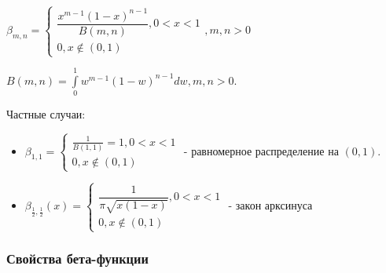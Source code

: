 \begin{definition}
  $\beta_{m, n} = \begin{cases}
    \dfrac{x^{m-1}  (1-x)^{n-1}}{B(m, n)}, 0 < x < 1 \\
    0, x \notin (0, 1)
  \end{cases}, m, n > 0$
\end{definition}

\begin{definition}
  $B(m, n) = \int\limits_0^1 w^{m-1} (1-w)^{n-1} dw, m, n>0$.
\end{definition}

\begin{remark}
  Частные случаи:
  \begin{itemize}
    \item $\beta_{1, 1} = \begin{cases}
        \frac{1}{B(1, 1)} = 1, 0<x<1 \\
        0, x\notin (0, 1)
      \end{cases}$ - равномерное распределение на $(0, 1)$.

    \item $\beta_{\frac{1}{2}, \frac{1}{2}} (x) = \begin{cases}
        \dfrac{1}{\pi \sqrt{x(1-x)}}, 0<x<1 \\
        0, x \notin (0, 1)
      \end{cases}$ - закон арксинуса
  \end{itemize}
\end{remark}

\subsubsection{Свойства бета-функции}

